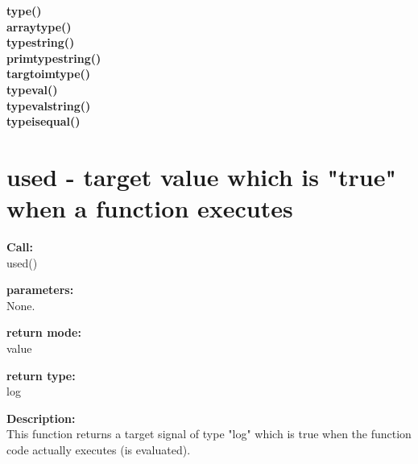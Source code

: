         
        {\bf type()}  \\
        {\bf arraytype()}  \\
        {\bf typestring()}  \\
        {\bf primtypestring()}  \\
        {\bf targtoimtype()}  \\
        {\bf typeval()}  \\
        {\bf typevalstring()}  \\
        {\bf typeisequal()}  \\


    \section{used - target value which is "true" when a function executes}\label{sec:ifused}
        
        {\bf Call:} \\
        used()
        
        {\bf parameters:} \\
        None.
        
        {\bf return mode:} \\
        value

        {\bf return type:} \\
        log
        
        {\bf Description:} \\
        This function returns a target signal of type "log" which is true
        when the function code actually executes (is evaluated).
        
